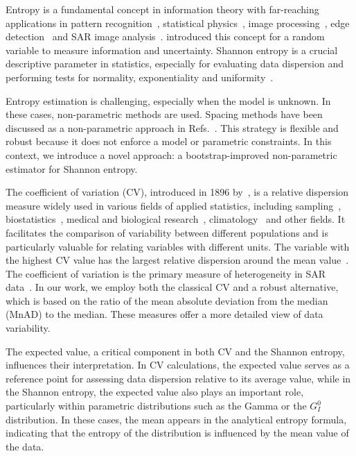 Entropy is a fundamental concept in information theory with far-reaching
applications in pattern recognition~\citep{Avval2021}, statistical physics~\citep{Presse2013}, image
processing~\citep{MohammadDjafari2015}, edge detection~\citep{Nascimento2014} and SAR image
analysis~\citep{Nascimento2019}.
\citet{Shannon1948} introduced this concept for a random variable to measure information and uncertainty. 
Shannon entropy is a crucial descriptive parameter in statistics, especially for evaluating data
dispersion and performing tests for normality, exponentiality and
uniformity~\citep{Wieczorkowski1999,Zamanzade2012}. 

Entropy estimation is challenging, especially when the model is unknown. In these cases,
non-parametric methods are used. Spacing methods have been discussed as
a non-parametric approach in Refs.~\citep{AlizadehNoughabi2010,Subhash2021}. This strategy is flexible
and robust because it does not enforce a model or parametric
constraints. In this context, we introduce a novel approach: a bootstrap-improved non-parametric estimator for Shannon entropy.

The coefficient of variation (CV), introduced in 1896 by~\citet{Pearson1896}, is a relative dispersion measure widely used
in various fields of applied statistics, including sampling~\citep{hendricks1936sampling},
biostatistics~\citep{Tian2005}, medical and biological research~\citep{SubrahmanyaNairy2003}, climatology~\citep{Chankham2024} and other
fields. It facilitates the comparison of variability between different
populations and is particularly valuable for relating variables with
different units. The variable with the highest CV
value has the largest relative dispersion around the mean
value~\citep{Banik2011}. The coefficient of variation is the primary
measure of heterogeneity in SAR data~\citep{Ulaby1986,Touzi1988}. 
In our work, we employ both the classical CV and a robust alternative, which is based on the ratio of the mean absolute deviation from the median (MnAD) to the median.  These measures offer a more detailed view of data variability. 

The expected value, a critical component in both CV and the Shannon entropy, influences their interpretation. 
In CV calculations, the expected value serves as a reference point for assessing data dispersion relative to its average value, while in the Shannon entropy, the expected value also plays an important role, particularly within parametric distributions such as the Gamma or the \({G}_I^0\)  distribution. 
In these cases, the mean appears in the analytical entropy formula, indicating that the entropy of the distribution is influenced by the mean value of the data.


